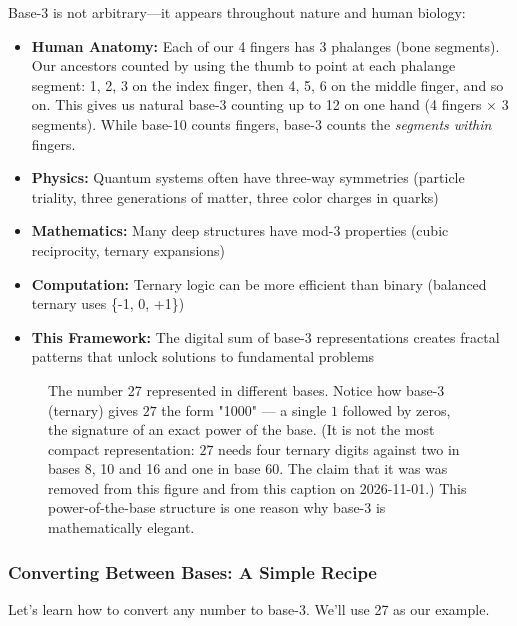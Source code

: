 \begin{keyidea}
Base-3 is not arbitrary—it appears throughout nature and human biology:
\begin{itemize}
\item \textbf{Human Anatomy:} Each of our 4 fingers has 3 phalanges (bone segments). Our ancestors counted by using the thumb to point at each phalange segment: 1, 2, 3 on the index finger, then 4, 5, 6 on the middle finger, and so on. This gives us natural base-3 counting up to 12 on one hand (4 fingers × 3 segments). While base-10 counts fingers, base-3 counts the \textit{segments within} fingers.
\item \textbf{Physics:} Quantum systems often have three-way symmetries (particle triality, three generations of matter, three color charges in quarks)
\item \textbf{Mathematics:} Many deep structures have mod-3 properties (cubic reciprocity, ternary expansions)
\item \textbf{Computation:} Ternary logic can be more efficient than binary (balanced ternary uses \{-1, 0, +1\})
\item \textbf{This Framework:} The digital sum of base-3 representations creates fractal patterns that unlock solutions to fundamental problems
\end{itemize}
\end{keyidea}

\begin{figure}[h]
\centering

\caption{The number 27 represented in different bases. Notice how base-3 (ternary) gives $27$ the form "1000" --- a single $1$ followed by zeros, the signature of an exact power of the base. (It is not the most compact representation: $27$ needs four ternary digits against two in bases 8, 10 and 16 and one in base 60. The claim that it was was removed from this figure and from this caption on 2026-11-01.) This power-of-the-base structure is one reason why base-3 is mathematically elegant.}
\label{fig:bases}
\end{figure}

\subsubsection*{Converting Between Bases: A Simple Recipe}

Let's learn how to convert any number to base-3. We'll use 27 as our example.


